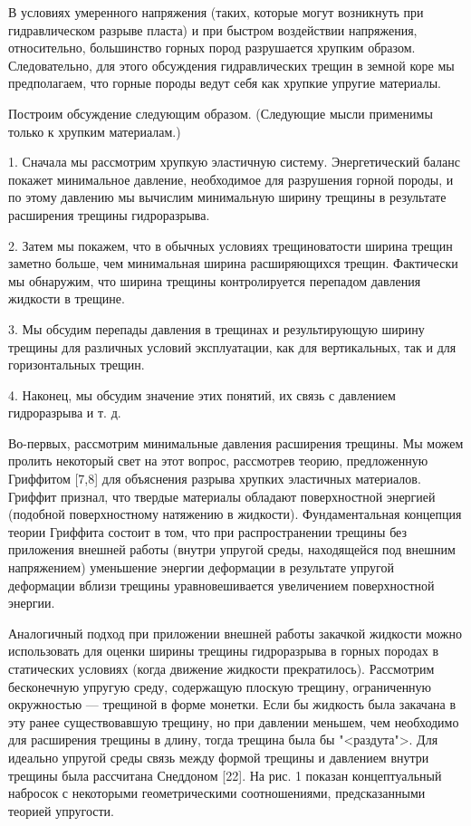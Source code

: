 \documentclass[a4paper, 12pt]{article}
\begin{document}
В условиях умеренного напряжения (таких, которые могут возникнуть при гидравлическом разрыве пласта) и при быстром воздействии напряжения, относительно, большинство горных пород разрушается хрупким образом.
Следовательно, для этого обсуждения гидравлических трещин в земной коре мы предполагаем, что горные породы ведут себя как хрупкие упругие материалы.

Построим обсуждение следующим образом. (Следующие мысли применимы только к хрупким материалам.)

1. Сначала мы рассмотрим хрупкую эластичную систему.
Энергетический баланс покажет минимальное давление, необходимое для разрушения горной породы, и по этому давлению мы вычислим минимальную ширину трещины в результате расширения трещины гидроразрыва.

2. Затем мы покажем, что в обычных условиях трещиноватости ширина трещин заметно больше, чем минимальная ширина расширяющихся трещин.
Фактически мы обнаружим, что ширина трещины контролируется перепадом давления жидкости в трещине.

3. Мы обсудим перепады давления в трещинах и результирующую ширину трещины для различных условий эксплуатации, как для вертикальных, так и для горизонтальных трещин.

4. Наконец, мы обсудим значение этих понятий, их связь с давлением гидроразрыва и т. д.

Во-первых, рассмотрим минимальные давления расширения трещины.
Мы можем пролить некоторый свет на этот вопрос, рассмотрев теорию, предложенную Гриффитом [7,8] для объяснения разрыва хрупких эластичных материалов.
Гриффит признал, что твердые материалы обладают поверхностной энергией (подобной поверхностному натяжению в жидкости).
Фундаментальная концепция теории Гриффита состоит в том, что при распространении трещины без приложения внешней работы (внутри упругой среды, находящейся под внешним напряжением) уменьшение энергии деформации в результате упругой деформации вблизи трещины уравновешивается увеличением поверхностной энергии.

Аналогичный подход при приложении внешней работы закачкой жидкости можно использовать для оценки ширины трещины гидроразрыва в горных породах в статических условиях (когда движение жидкости прекратилось).
Рассмотрим бесконечную упругую среду, содержащую плоскую трещину, ограниченную окружностью — трещиной в форме монетки.
Если бы жидкость была закачана в эту ранее существовавшую трещину, но при давлении меньшем, чем необходимо для расширения трещины в длину, тогда трещина была бы "<раздута">.
Для идеально упругой среды связь между формой трещины и давлением внутри трещины была рассчитана Снеддоном [22].
На рис. 1 показан концептуальный набросок с некоторыми геометрическими соотношениями, предсказанными теорией упругости.
\end{document}
